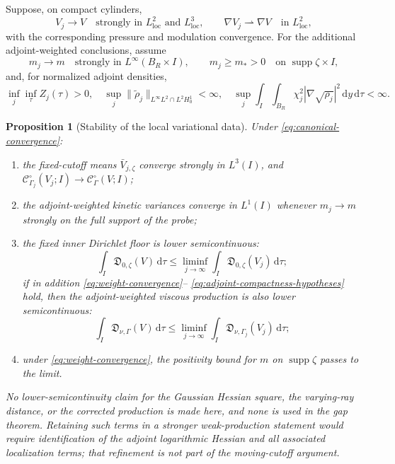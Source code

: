 \documentclass[11pt]{amsart}
\numberwithin{equation}{section}
\theoremstyle{plain}
\newtheorem{proposition}[proposition]{Proposition}
\theoremstyle{definition}
\theoremstyle{remark}
\newcommand{\dd}{\,\mathrm d}
\newcommand{\supp}{\operatorname{supp}}
\newcommand{\OscMass}{\mathcal C^{\circ}}
\begin{document}
Suppose, on compact cylinders,
\begin{equation}\label{eq:canonical-convergence}
 V_j\to V\quad\text{strongly in }L^2_{\mathrm{loc}}
 \text{ and }L^3_{\mathrm{loc}},
 \qquad
 \nabla V_j\rightharpoonup\nabla V\quad\text{in }L^2_{\mathrm{loc}},
\end{equation}
with the corresponding pressure and modulation convergence.  For the
additional adjoint-weighted conclusions, assume
\begin{equation}\label{eq:weight-convergence}
 m_j\to m\quad\text{strongly in }L^\infty(B_R\times I),
 \qquad m_j\ge m_*>0\quad\text{on }\supp\zeta\times I,
\end{equation}
and, for normalized adjoint densities,
\begin{equation}\label{eq:adjoint-compactness-hypotheses}
 \inf_j\inf_\tau Z_j(\tau)>0,\quad
 \sup_j\|\widetilde\rho_j\|_{L^\infty L^2\cap L^2H^1_0}<\infty,
 \quad
 \sup_j\int_I\int_{B_R}\chi_j^2
 |\nabla\sqrt{\rho_j}|^2\dd y\dd\tau<\infty.
\end{equation}
\begin{proposition}[Stability of the local variational data]
\label{prop:entropy-compactification}
Under \eqref{eq:canonical-convergence}:
\begin{enumerate}[label=\textup{(\roman*)},leftmargin=2.2em]
\item the fixed-cutoff means \(\bar V_{j,\zeta}\) converge strongly in
\(L^3(I)\), and \(\OscMass_{\Gamma_j}(V_j;I)\to
\OscMass_\Gamma(V;I)\);
\item the adjoint-weighted kinetic variances converge in \(L^1(I)\) whenever
\(m_j\to m\) strongly on the full support of the probe;
\item the fixed inner Dirichlet floor is lower semicontinuous:
\begin{equation}\label{eq:inner-production-lsc}
 \int_I\mathfrak D_{0,\zeta}(V)\dd\tau
 \le\liminf_{j\to\infty}
 \int_I\mathfrak D_{0,\zeta}(V_j)\dd\tau;
\end{equation}
if in addition \eqref{eq:weight-convergence}--
\eqref{eq:adjoint-compactness-hypotheses} hold, then the adjoint-weighted
viscous production is also lower semicontinuous:
\begin{equation}\label{eq:viscous-production-lsc}
 \int_I\mathfrak D_{\nu,\Gamma}(V)\dd\tau
 \le\liminf_{j\to\infty}
 \int_I\mathfrak D_{\nu,\Gamma_j}(V_j)\dd\tau;
\end{equation}
\item under \eqref{eq:weight-convergence}, the positivity bound for \(m\) on
\(\supp\zeta\) passes to the limit.
\end{enumerate}
No lower-semicontinuity claim for the Gaussian Hessian square, the varying-ray
distance, or the corrected production is made here, and none is used in the
gap theorem.  Retaining such terms in a stronger weak-production statement
would require identification of the adjoint logarithmic Hessian and all
associated localization terms; that refinement is not part of the moving-cutoff
argument.
\end{proposition}
\end{document}
